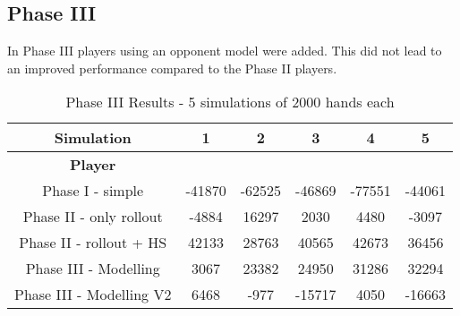\subsection{Phase III}
In Phase III players using an opponent model were added. This did not lead to an improved performance compared to the
Phase II players.

\begin{table}[!h]
\center
\caption{Phase III Results - 5 simulations of 2000 hands each}
\begin{tabular}{ c | c c c c c}
    \textbf{Simulation} & 1 & 2 & 3 & 4 & 5 \\
    \hline
    \textbf{Player} \\
    Phase I - simple            & -41870 & -62525   & -46869 & -77551 & -44061\\
    Phase II - only rollout     & -4884 & 16297     & 2030   & 4480  & -3097\\
    Phase II - rollout + HS     & 42133 & 28763     & 40565  & 42673 & 36456\\
    Phase III - Modelling       & 3067  & 23382     & 24950  & 31286 & 32294\\
    Phase III - Modelling V2    & 6468  & -977      & -15717 & 4050  & -16663\\
\end{tabular}
\end{table}

